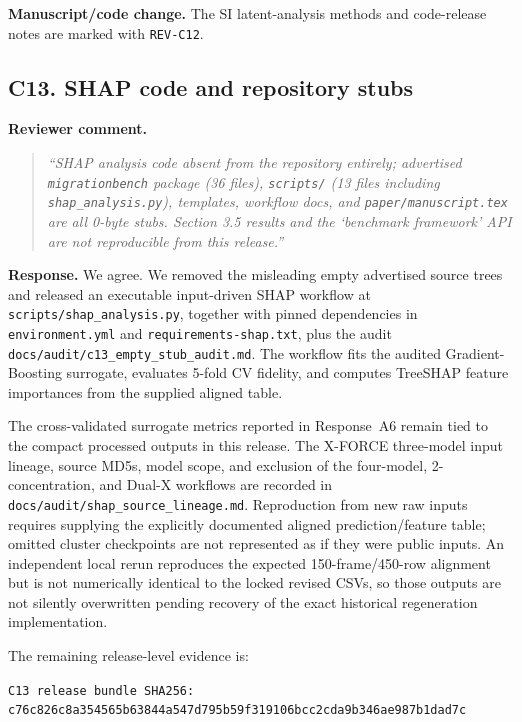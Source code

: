 \documentclass[11pt,a4paper]{article}
\begin{document}
\noindent\textbf{Manuscript/code change.}
The SI latent-analysis methods and code-release notes are marked with \texttt{REV-C12}.

\subsection*{C13. SHAP code and repository stubs}

\noindent\textbf{Reviewer comment.}
\begin{quote}
\itshape
``SHAP analysis code absent from the repository entirely; advertised \texttt{migrationbench} package (36 files), \texttt{scripts/} (13 files including \texttt{shap\_analysis.py}), templates, workflow docs, and \texttt{paper/manuscript.tex} are all 0-byte stubs. Section 3.5 results and the `benchmark framework' API are not reproducible from this release.''
\end{quote}

\noindent\textbf{Response.}
We agree. We removed the misleading empty advertised source trees and released an executable input-driven SHAP workflow at \texttt{scripts/shap\_analysis.py}, together with pinned dependencies in \texttt{environment.yml} and \texttt{requirements-shap.txt}, plus the audit \texttt{docs/audit/c13\_empty\_stub\_audit.md}. The workflow fits the audited Gradient-Boosting surrogate, evaluates 5-fold CV fidelity, and computes TreeSHAP feature importances from the supplied aligned table.

The cross-validated surrogate metrics reported in Response~A6 remain tied to the compact processed outputs in this release. The X-FORCE three-model input lineage, source MD5s, model scope, and exclusion of the four-model, 2-concentration, and Dual-X workflows are recorded in \texttt{docs/audit/shap\_source\_lineage.md}. Reproduction from new raw inputs requires supplying the explicitly documented aligned prediction/feature table; omitted cluster checkpoints are not represented as if they were public inputs. An independent local rerun reproduces the expected 150-frame/450-row alignment but is not numerically identical to the locked revised CSVs, so those outputs are not silently overwritten pending recovery of the exact historical regeneration implementation.

The remaining release-level evidence is:

\begin{center}
\texttt{C13 release bundle SHA256: c76c826c8a354565b63844a547d795b59f319106bcc2cda9b346ae987b1dad7c}
\end{center}
\end{document}
